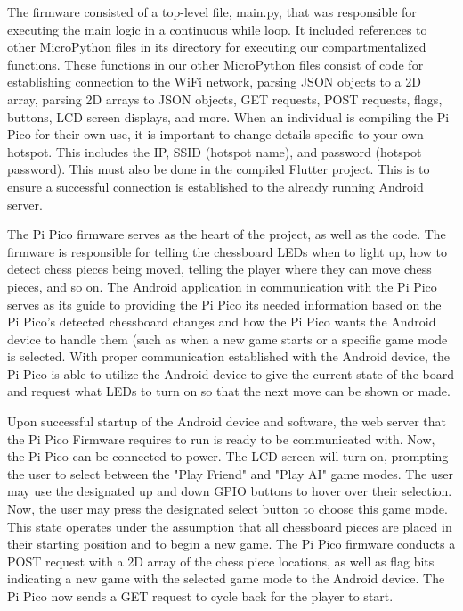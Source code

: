 \documentclass[11pt,journal]{IEEEtran}
\begin{document}
The firmware consisted of a top-level file, main.py, that was responsible for executing the main logic in a continuous while loop. It included references to other MicroPython files in its directory for executing our compartmentalized functions. These functions in our other MicroPython files consist of code for establishing connection to the WiFi network, parsing JSON objects to a 2D array, parsing 2D arrays to JSON objects, GET requests, POST requests, flags, buttons, LCD screen displays, and more.
When an individual is compiling the Pi Pico for their own use, it is important to change details specific to your own hotspot. This includes the IP, SSID (hotspot name), and password (hotspot password). This must also be done in the compiled Flutter project. This is to ensure a successful connection is established to the already running Android server. 

The Pi Pico firmware serves as the heart of the project, as well as the code. The firmware is responsible for telling the chessboard LEDs when to light up, how to detect chess pieces being moved, telling the player where they can move chess pieces, and so on. The Android application in communication with the Pi Pico serves as its guide to providing the Pi Pico its needed information based on the Pi Pico's detected chessboard changes and how the Pi Pico wants the Android device to handle them (such as when a new game starts or a specific game mode is selected. With proper communication established with the Android device, the Pi Pico is able to utilize the Android device to give the current state of the board and request what LEDs to turn on so that the next move can be shown or made.

Upon successful startup of the Android device and software, the web server that the Pi Pico Firmware requires to run is ready to be communicated with. Now, the Pi Pico can be connected to power. The LCD screen will turn on, prompting the user to select between the "Play Friend" and "Play AI" game modes. The user may use the designated up and down GPIO buttons to hover over their selection. Now, the user may press the designated select button to choose this game mode. This state operates under the assumption that all chessboard pieces are placed in their starting position and to begin a new game. The Pi Pico firmware conducts a POST request with a 2D array of the chess piece locations, as well as flag bits indicating a new game with the selected game mode to the Android device. The Pi Pico now sends a GET request to cycle back for the player to start.
\end{document}
